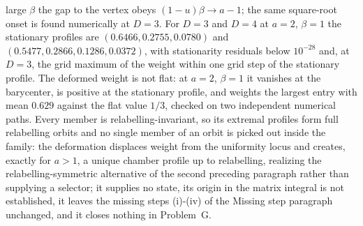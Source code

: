 large \(\beta\) the gap to the vertex obeys \((1-u)\beta\to a-1\); the same square-root onset is found numerically at \(D=3\). For \(D=3\) and \(D=4\) at \(a=2\), \(\beta=1\) the stationary profiles are \((0.6466,0.2755,0.0780)\) and \((0.5477,0.2866,0.1286,0.0372)\), with stationarity residuals below \(10^{-28}\) and, at \(D=3\), the grid maximum of the weight within one grid step of the stationary profile. The deformed weight is not flat: at \(a=2\), \(\beta=1\) it vanishes at the barycenter, is positive at the stationary profile, and weights the largest entry with mean \(0.629\) against the flat value \(1/3\), checked on two independent numerical paths. Every member is relabelling-invariant, so its extremal profiles form full relabelling orbits and no single member of an orbit is picked out inside the family: the deformation displaces weight from the uniformity locus and creates, exactly for \(a>1\), a unique chamber profile up to relabelling, realizing the relabelling-symmetric alternative of the second preceding paragraph rather than supplying a selector; it supplies no state, its origin in the matrix integral is not established, it leaves the missing steps (i)-(iv) of the Missing step paragraph unchanged, and it closes nothing in Problem~G.

